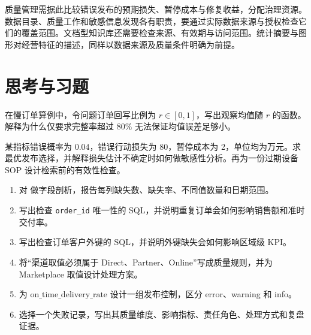 质量管理需据此比较错误发布的预期损失、暂停成本与修复收益，分配治理资源。数据目录、质量工作和敏感信息发现各有职责，要通过实际数据来源与授权检查它们的覆盖范围。文档型知识库还需要检查来源、有效期与访问范围。统计摘要与图形对经营特征的描述，同样以数据来源及质量条件明确为前提。


\section*{思考与习题}

\begin{exercise}[从完整率到偏差]
在慢订单算例中，令问题订单回写比例为 \(r\in[0,1]\)，写出观察均值随 \(r\) 的函数。解释为什么仅要求完整率超过 \(80\%\) 无法保证均值误差足够小。
\end{exercise}
\begin{exercise}[发布与检索控制]
某指标错误概率为 \(0.04\)，错误行动损失为 80，暂停成本为 2，单位均为万元。求最优发布选择，并解释损失估计不确定时如何做敏感性分析。再为一份过期设备 SOP 设计检索前的有效性检查。
\end{exercise}

\begin{exercise}
\begin{enumerate}
  \item 对  做字段剖析，报告每列缺失数、缺失率、不同值数量和日期范围。
  \item 写出检查 \texttt{order\_id} 唯一性的 SQL，并说明重复订单会如何影响销售额和准时交付率。
  \item 写出检查订单客户外键的 SQL，并说明外键缺失会如何影响区域级 KPI。
  \item 将“渠道取值必须属于 Direct、Partner、Online”写成质量规则，并为 Marketplace 取值设计处理方案。
  \item 为 \(\mathrm{on\_time\_delivery\_rate}\) 设计一组发布控制，区分 error、warning 和 info。
  \item 选择一个失败记录，写出其质量维度、影响指标、责任角色、处理方式和复盘证据。
\end{enumerate}
\end{exercise}


